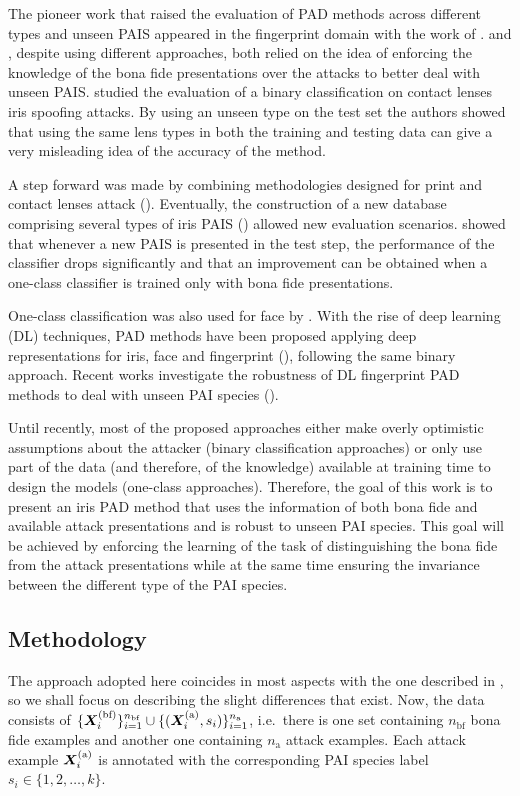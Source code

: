 The pioneer work that raised the evaluation of PAD methods across different types and unseen PAIS appeared in the fingerprint domain with the work of \citet{marasco2011robustness}. \citet{rattani2015openset} and \citet{sequeira2015fingerprint}, despite using different approaches, both relied on the idea of enforcing the knowledge of the bona fide presentations over the attacks to better deal with unseen PAIS. \citet{bowyer2014cosmetic} studied the evaluation of a binary classification on contact lenses iris spoofing attacks. By using an unseen type on the test set the authors showed that using the same lens types in both the training and testing data can give a very misleading idea of the accuracy of the method.

A step forward was made by combining methodologies designed for print and contact lenses attack (\citet{sequeira2014ildmma}). Eventually, the construction of a new database comprising several types of iris PAIS (\citet{raghavendra2015VSIA}) allowed new evaluation scenarios. \citet{sequeira2016realistic} showed that whenever a new PAIS is presented in the test step, the performance of the classifier drops significantly and that an improvement can be obtained when a one-class classifier is trained only with bona fide presentations.

One-class classification was also used for face by \citet{kittler2017faceanomaly}. With the rise of deep learning (DL) techniques, PAD methods have been proposed applying deep representations for iris, face and fingerprint (\citet{menotti2015deep,pinto2018counteracting}), following the same binary approach. Recent works investigate the robustness of DL fingerprint PAD methods to deal with unseen PAI species (\citet{tolosana2018towards}).

Until recently, most of the proposed approaches either make overly optimistic assumptions about the attacker (binary classification approaches) or only use part of the data (and therefore, of the knowledge) available at training time to design the models (one-class approaches). Therefore, the goal of this work is to present an iris PAD method that uses the information of both bona fide and available attack presentations and is robust to unseen PAI species. This goal will be achieved by enforcing the learning of the task of distinguishing the bona fide from the attack presentations while at the same time ensuring the invariance between the different type of the PAI species.

\subsection{Methodology}
\label{sec:adv_iris_attack_method}
The approach adopted here coincides in most aspects with the one described in , so we shall focus on describing the slight differences that exist. Now, the data consists of $\{{\bm{X}}^{(\text{bf})}_i\}_{i=1}^{n_{\text{bf}}} \cup \{({\bm{X}}^{(\text{a})}_i,s_i)\}_{i=1}^{n_{\text{a}}}$, i.e.\ there is one set containing $n_{\text{bf}}$ bona fide examples and another one containing $n_{\text{a}}$ attack examples. Each attack example ${\bm{X}}^{(\text{a})}_i$ is annotated with the corresponding PAI species label $s_i \in \{1,2,\dots,k\}$.

